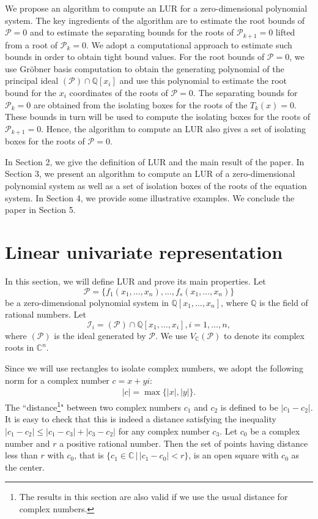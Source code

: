 \documentclass[amsthm]{JSC_LaTex_2007_Mar_12/elsart}
\def\C{{\mathbb{C}}}
\def\Q{{\mathbb{Q}}}
\def\PS{ {\mathcal{P}} }
\def\IS{{\mathcal{I}}}
\begin{document}
We propose an algorithm to compute an LUR for a zero-dimensional
polynomial system. The key ingredients of the algorithm are to
estimate the root bounds of $\PS=0$ and to estimate the separating
bounds for the roots of $\PS_{k+1}=0$ lifted from a root of
$\PS_{k}=0$. We adopt a computational approach to estimate such
bounds in order to obtain tight bound values. For the root bounds of
$\PS=0$, we use Gr\"obner basis computation to obtain the generating
polynomial of the principal ideal $(\PS)\cap\Q[x_i]$ and use this
polynomial to estimate the root bound for the $x_i$ coordinates of
the roots of $\PS=0$.
The separating bounds for $\PS_k=0$ are obtained from the isolating
boxes for the roots of the $T_k(x)=0$. These bounds in turn will be
used to compute the isolating boxes for the roots of $\PS_{k+1}=0$.
Hence, the algorithm to compute an LUR also gives a set of isolating
boxes for the roots of $\PS=0$.

In Section 2, we give the definition of LUR and the main result of
the paper.
In Section 3, we present an algorithm to compute an LUR of a
zero-dimensional polynomial system as well as a set of isolation
boxes of the roots of the equation system.
In Section 4, we provide some illustrative examples.
We conclude the paper in Section 5.


\section{Linear univariate representation}
In this section, we will define LUR and prove its main properties.
Let
$$\mathcal{P} = \{f_1(x_1,\ldots,x_n),\ldots, f_s(x_1,\ldots,x_n) \}$$
be a zero-dimensional polynomial system in $\Q[x_1,\ldots,x_n]$,
where $\Q$ is the field of rational numbers. Let
 $$\IS_i = (\mathcal{P})\cap\Q[x_1,\ldots,x_i],i=1,\ldots,n,$$
where $(\PS)$ is the ideal generated by $\PS$.
We use $V_{\C}(\mathcal{P})$ to denote its complex roots in $\C^n$.

Since we will use rectangles to isolate complex numbers, we adopt
the following norm for a complex number $c = x + yi$:
\begin{eqnarray}\label{eq-dis}|c | = \max\{|x|,|y|\}.\end{eqnarray}
The ``distance\footnote{The results in this section are also valid
if we use the usual distance for complex numbers.}" between two
complex numbers $c_1$ and $c_2$ is defined to be $|c_1-c_2|$. It is
easy to check that this is indeed a distance satisfying the
inequality $|c_1-c_2|\le |c_1-c_3| + |c_3-c_2|$ for any complex
number $c_3$.
Let $c_0$ be a complex number and $r$ a positive rational number.
Then the set of points having distance less than $r$ with $c_0$,
that is $\{ c_1\in\C \, |\, |c_1-c_0|< r \}$, is an open square with
$c_0$ as the center.
\end{document}
